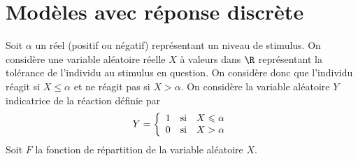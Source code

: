 \documentclass[11pt]{article}%
\begin{document}
\section{Modèles avec réponse discrète}
\noindent
Soit $\alpha $ un réel (positif ou négatif) représentant un niveau 
de stimulus. On considère une variable aléatoire réelle $X$ à 
valeurs dans $\R$ représentant la tolérance de l'individu au 
stimulus en question. On considère donc que l'individu réagit si $X 
\leq \alpha$ et ne réagit pas si $X >\alpha $. On considère la 
variable aléatoire $Y$ indicatrice de la réaction définie par 
\[
 Y = 
 \left\{ \begin{array}{lll}
  1 & {\rm si} & X\leq \alpha \\
  0 & {\rm si} & X>\alpha 
  \end{array} \right.
\]
Soit $F$ la fonction de répartition de la variable aléatoire $X$.
\end{document}
